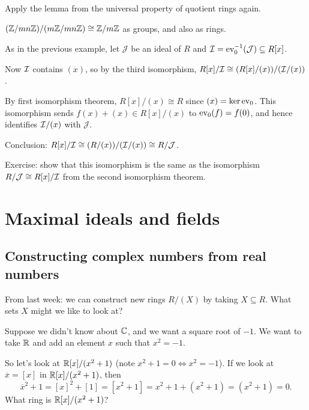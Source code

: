 \documentclass[12pt,letterpaper]{report}
\begin{document}
\begin{thmproof}
  Apply the lemma from the universal property of quotient rings again.
\end{thmproof}

\begin{ex}
  $(\mathbb{Z}/mn\mathbb{Z})/(m\mathbb{Z}/mn\mathbb{Z}) \cong \mathbb{Z}/{m}\mathbb{Z}$ as groups, and also as rings.
\end{ex}

\begin{ex}
  As in the previous example, let $\mathcal{J}$ be an ideal of $R$ and
  $\mathcal{I} = \operatorname{ev}_0^{-1}(\mathcal{J}) \subseteq R[x]$.

  Now $\mathcal{I}$ contains $(x)$, so by the third isomorphism,
  $R[x]/\mathcal{I} \cong (R[x]/(x))/(\mathcal{I}/(x))$.

  By first isomorphism theorem, $R[x]/(x) \cong R$ since $(x) = \ker\operatorname{ev}_0$.
  This isomorphism sends $f(x) + (x) \in R[x]/(x)$ to $\operatorname{ev}_0(f) = f(0)$, and hence identifies
  $\mathcal{I}/(x)$ with $\mathcal{J}$.

  Conclusion: $R[x]/\mathcal{I} \cong (R/(x))/(\mathcal{I}/(x)) \cong R/\mathcal{J}$.

  Exercise: show that this isomorphism is the same as the isomorphism
  $R/\mathcal{J} \cong R[x]/\mathcal{I}$ from the second isomorphism theorem.
\end{ex}


\section{Maximal ideals and fields}

\subsection{Constructing complex numbers from real numbers}

From last week: we can construct new rings $R/(X)$ by taking $X \subseteq R$.
What sets $X$ might we like to look at?

Suppose we didn't know about $\mathbb{C}$, and we want a square root of $-1$.
We want to take $\mathbb{R}$ and add an element $x$ such that $x^2 = -1$.

So let's look at $\mathbb{R}[x]/(x^2 + 1)$ (note $x^2 + 1 = 0 \iff x^2 = -1$).
If we look at $\overline{x} = [x]$ in $\mathbb{R}[x]/(x^2 + 1)$, then
\[
  \overline{x}^2 + 1 = [x]^2 + [1] = [x^2 + 1] = x^2 + 1 + (x^2 + 1) = (x^2 + 1) = 0.
\]
What ring is $\mathbb{R}[x]/(x^2 + 1)$?
\end{document}
